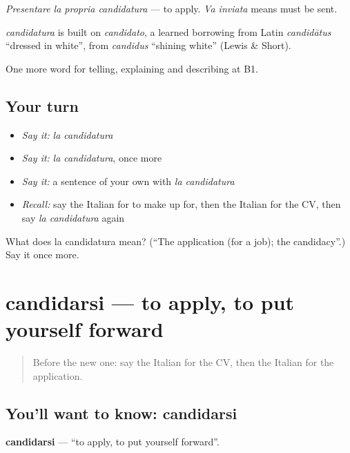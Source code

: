 \emph{Presentare la propria candidatura} — to apply. \emph{Va inviata} means must be sent.

\begin{cousinweb}
\emph{candidatura} is built on \emph{candidato}, a learned borrowing from Latin \emph{candidātus} \textquotedblleft{}dressed in white\textquotedblright{}, from \emph{candidus} \textquotedblleft{}shining white\textquotedblright{} (Lewis \& Short).
\end{cousinweb}

\begin{grammarlens}[title={What you've built}]
One more word for telling, explaining and describing at B1.
\end{grammarlens}

\subsection*{Your turn}
\begin{itemize}
\raggedright
  \item \emph{Say it:} \emph{la candidatura}
  \item \emph{Say it:} \emph{la candidatura}, once more
  \item \emph{Say it:} a sentence of your own with \emph{la candidatura}
  \item \emph{Recall:} say the Italian for to make up for, then the Italian for the CV, then say \emph{la candidatura} again
\end{itemize}

\begin{tcolorbox}[breakable,colback=teal!4,colframe=teal!35!black,title={Before you move on}]
What does la candidatura mean? (\textquotedblleft{}The application (for a job); the candidacy\textquotedblright{}.) Say it once more.
\end{tcolorbox}
\section[candidarsi]{candidarsi — to apply, to put yourself forward}

\label{lesson:IT-C356-candidarsi}



\begin{quote}
Before the new one: say the Italian for the CV, then the Italian for the application.
\end{quote}

\subsection*{You'll want to know: candidarsi}
\textbf{candidarsi} — \textquotedblleft{}to apply, to put yourself forward\textquotedblright{}.

